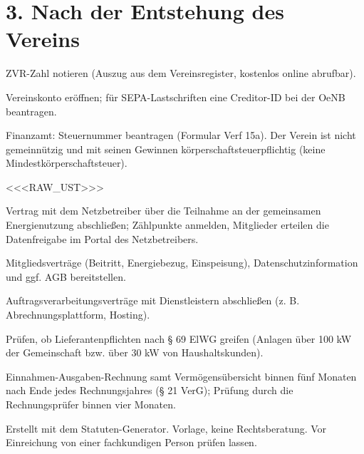 \documentclass[a4paper,10pt]{article}
\begin{document}
\section*{3. Nach der Entstehung des Vereins}
\begin{checkliste}
  \item ZVR-Zahl notieren (Auszug aus dem Vereinsregister, kostenlos online abrufbar).
  \item Vereinskonto eröffnen; für SEPA-Lastschriften eine Creditor-ID bei der OeNB beantragen.
  \item Finanzamt: Steuernummer beantragen (Formular Verf 15a). Der Verein ist nicht gemeinnützig und mit seinen
        Gewinnen körperschaftsteuerpflichtig (keine Mindestkörperschaftsteuer).
  \item <<<RAW_UST>>>
  \item Vertrag mit dem Netzbetreiber über die Teilnahme an der gemeinsamen Energienutzung abschließen; Zählpunkte
        anmelden, Mitglieder erteilen die Datenfreigabe im Portal des Netzbetreibers.
  \item Mitgliedsverträge (Beitritt, Energiebezug, Einspeisung), Datenschutzinformation und ggf. AGB bereitstellen.
  \item Auftragsverarbeitungsverträge mit Dienstleistern abschließen (z. B. Abrechnungsplattform, Hosting).
  \item Prüfen, ob Lieferantenpflichten nach § 69 ElWG greifen (Anlagen über 100 kW der Gemeinschaft bzw.
        über 30 kW von Haushaltskunden).
  \item Einnahmen-Ausgaben-Rechnung samt Vermögensübersicht binnen fünf Monaten nach Ende jedes Rechnungsjahres
        (§ 21 VerG); Prüfung durch die Rechnungsprüfer binnen vier Monaten.
\end{checkliste}

\vspace{4mm}
{\small\color{midgray}Erstellt mit dem Statuten-Generator. Vorlage, keine Rechtsberatung. Vor Einreichung von einer
fachkundigen Person prüfen lassen.}
\end{document}
